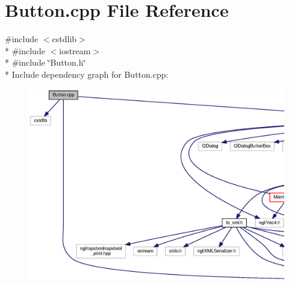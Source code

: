 \section{Button.\-cpp File Reference}
\label{_button_8cpp}
{\ttfamily \#include $<$cstdlib$>$}\\*
{\ttfamily \#include $<$iostream$>$}\\*
{\ttfamily \#include \char`\"{}Button.\-h\char`\"{}}\\*
Include dependency graph for Button.\-cpp\-:
\nopagebreak
\begin{figure}[H]
\begin{center}
\leavevmode
\includegraphics[width=350pt]{_button_8cpp__incl}
\end{center}
\end{figure}
